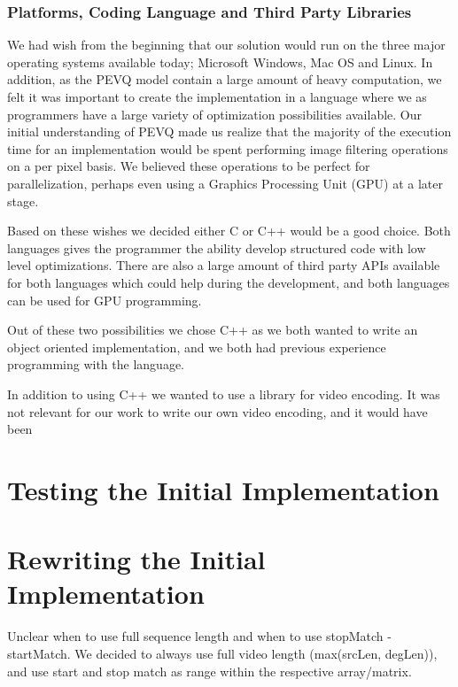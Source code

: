 \subsection{Platforms, Coding Language and Third Party Libraries}
We had wish from the beginning that our solution would run on the three major operating systems available today; Microsoft Windows, Mac OS and Linux. In addition, as the PEVQ model contain a large amount of heavy computation, we felt it was important to create the implementation in a language where we as programmers have a large variety of optimization possibilities available. Our initial understanding of PEVQ made us realize that the majority of the execution time for an implementation would be spent performing image filtering operations on a per pixel basis. We believed these operations to be perfect for parallelization, perhaps even using a Graphics Processing Unit (GPU) at a later stage.

Based on these wishes we decided either C or C++ would be a good choice. Both languages gives the programmer the ability develop structured code with low level optimizations. There are also a large amount of third party APIs available for both languages which could help during the development, and both languages can be used for GPU programming. 

Out of these two possibilities we chose C++ as we both wanted to write an object oriented implementation, and we both had previous experience programming with the language. 

In addition to using C++ we wanted to use a library for video encoding. It was not relevant for our work to write our own video encoding, and it would have been 



\chapter{Testing the Initial Implementation}
       


\chapter{Rewriting the Initial Implementation}
Unclear when to use full sequence length and when to use stopMatch - startMatch. We decided to always use full video length (max(srcLen, degLen)), and use start and stop match as range within the respective array/matrix.




